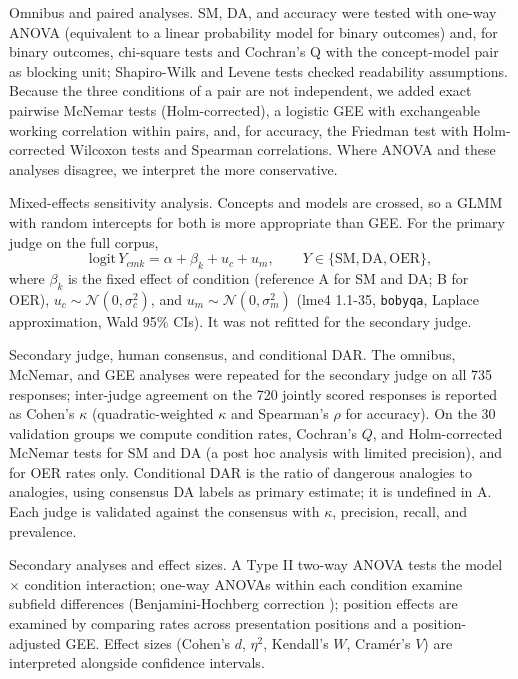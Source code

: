 \documentclass[journal,article,submit,pdftex,moreauthors]{Definitions/mdpi}
\begin{document}
Omnibus and paired analyses. SM, DA, and accuracy were tested with one-way ANOVA (equivalent to a linear probability model for binary outcomes) and, for binary outcomes, chi-square tests and Cochran's Q \cite{cochran1950comparison} with the concept-model pair as blocking unit; Shapiro-Wilk \cite{shapiro1965analysis} and Levene tests \cite{levene1960robust} checked readability assumptions. Because the three conditions of a pair are not independent, we added exact pairwise McNemar tests \cite{mcnemar1947note} (Holm-corrected), a logistic GEE with exchangeable working correlation within pairs, and, for accuracy, the Friedman test with Holm-corrected Wilcoxon tests and Spearman correlations. Where ANOVA and these analyses disagree, we interpret the more conservative.

Mixed-effects sensitivity analysis. Concepts and models are crossed, so a GLMM with random intercepts for both is more appropriate than GEE. For the primary judge on the full corpus,
\begin{equation}
  \text{logit}\,Y_{cmk} = \alpha + \beta_k + u_c + u_m, \qquad Y \in \{\mathrm{SM}, \mathrm{DA}, \mathrm{OER}\},
\end{equation}
where $\beta_k$ is the fixed effect of condition (reference A for SM and DA; B for OER), $u_c \sim \mathcal{N}(0, \sigma_c^2)$, and $u_m \sim \mathcal{N}(0, \sigma_m^2)$ (lme4 1.1-35, \texttt{bobyqa}, Laplace approximation, Wald 95\% CIs). It was not refitted for the secondary judge.

Secondary judge, human consensus, and conditional DAR. The omnibus, McNemar, and GEE analyses were repeated for the secondary judge on all 735 responses; inter-judge agreement on the 720 jointly scored responses is reported as Cohen's $\kappa$ (quadratic-weighted $\kappa$ and Spearman's $\rho$ for accuracy). On the 30 validation groups we compute condition rates, Cochran's $Q$, and Holm-corrected McNemar tests for SM and DA (a post hoc analysis with limited precision), and for OER rates only. Conditional DAR is the ratio of dangerous analogies to analogies, using consensus DA labels as primary estimate; it is undefined in A. Each judge is validated against the consensus with $\kappa$, precision, recall, and prevalence.

Secondary analyses and effect sizes. A Type II two-way ANOVA tests the model $\times$ condition interaction; one-way ANOVAs within each condition examine subfield differences (Benjamini-Hochberg correction \cite{benjamini1995controlling}); position effects are examined by comparing rates across presentation positions and a position-adjusted GEE. Effect sizes (Cohen's $d$, $\eta^2$, Kendall's $W$, Cram\'{e}r's $V$) \cite{cohen1988statistical, lakens2013calculating} are interpreted alongside confidence intervals.
\end{document}
